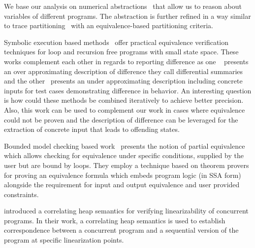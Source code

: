 We base our analysis on numerical abstractions~\cite{CousotHalbwachs78,Mine2006} that allow us to reason about variables of different programs. The abstraction is further refined in a way similar to trace partitioning~\cite{MauborgneRival07} with an equivalence-based partitioning criteria.

Symbolic execution based methods~\cite{DwyerElbaumPerson08,EnglerRamos11} offer practical equivalence verification techniques for loop and recursion free programs with small state space. These works complement each other in regards to reporting difference as one ~\cite{DwyerElbaumPerson08} presents an over approximating description of difference they call differential summaries and the other~\cite{EnglerRamos11} presents an under approximating description including concrete inputs for test cases demonstrating difference in behavior. An interesting question is how could these methods be combined iteratively to achieve better precision. Also, this work can be used to complement our work in cases where equivalence could not be proven and the description of difference can be leveraged for the extraction of concrete input that leads to offending states.

Bounded model checking based work~\cite{GodlinStrichman09} presents the notion of partial equivalence which allows checking for equivalence under specific conditions, supplied by the user but are bound by loops. They employ a technique based on theorem provers for proving an equivalence formula which embeds program logic (in SSA form) alongside the requirement for input and output equivalence and user provided constraints.

\cite{AmitRinetzkyRepsSagivYahav07} introduced a correlating heap semantics for verifying linearizability of concurrent programs. In their work, a correlating heap semantics is used to establish correspondence between a concurrent program and a sequential version of the program at specific linearization points.
